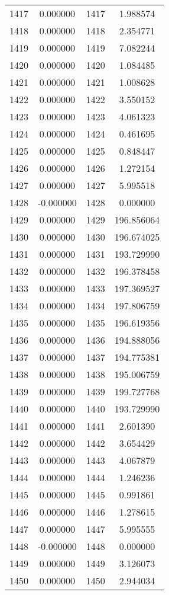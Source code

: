 \documentclass[12pt]{article}
\begin{document}
\begin{longtable}{@{}cccc@{}}
1417 & 0.000000 & 1417 & 1.988574 \\
1418 & 0.000000 & 1418 & 2.354771 \\
1419 & 0.000000 & 1419 & 7.082244 \\
1420 & 0.000000 & 1420 & 1.084485 \\
1421 & 0.000000 & 1421 & 1.008628 \\
1422 & 0.000000 & 1422 & 3.550152 \\
1423 & 0.000000 & 1423 & 4.061323 \\
1424 & 0.000000 & 1424 & 0.461695 \\
1425 & 0.000000 & 1425 & 0.848447 \\
1426 & 0.000000 & 1426 & 1.272154 \\
1427 & 0.000000 & 1427 & 5.995518 \\
1428 & -0.000000 & 1428 & 0.000000 \\
1429 & 0.000000 & 1429 & 196.856064 \\
1430 & 0.000000 & 1430 & 196.674025 \\
1431 & 0.000000 & 1431 & 193.729990 \\
1432 & 0.000000 & 1432 & 196.378458 \\
1433 & 0.000000 & 1433 & 197.369527 \\
1434 & 0.000000 & 1434 & 197.806759 \\
1435 & 0.000000 & 1435 & 196.619356 \\
1436 & 0.000000 & 1436 & 194.888056 \\
1437 & 0.000000 & 1437 & 194.775381 \\
1438 & 0.000000 & 1438 & 195.006759 \\
1439 & 0.000000 & 1439 & 199.727768 \\
1440 & 0.000000 & 1440 & 193.729990 \\
1441 & 0.000000 & 1441 & 2.601390 \\
1442 & 0.000000 & 1442 & 3.654429 \\
1443 & 0.000000 & 1443 & 4.067879 \\
1444 & 0.000000 & 1444 & 1.246236 \\
1445 & 0.000000 & 1445 & 0.991861 \\
1446 & 0.000000 & 1446 & 1.278615 \\
1447 & 0.000000 & 1447 & 5.995555 \\
1448 & -0.000000 & 1448 & 0.000000 \\
1449 & 0.000000 & 1449 & 3.126073 \\
1450 & 0.000000 & 1450 & 2.944034 \\

\end{longtable}
\end{document}
